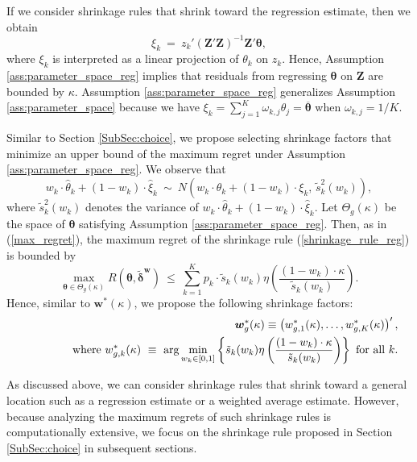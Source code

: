 \documentclass[12pt,a4paper]{article}
\begin{document}
If we consider shrinkage rules that shrink toward the regression estimate, then we obtain
\[
\xi_k \ = \ z_k' \left( \bm{Z}'\bm{Z} \right)^{-1} \bm{Z}' \bm{\theta},
\]
where $\xi_k$ is interpreted as a linear projection of $\theta_k$ on $z_k$. Hence, Assumption \ref{ass:parameter_space_reg} implies that residuals from regressing $\bm{\theta}$ on $\bm{Z}$ are bounded by $\kappa$. Assumption \ref{ass:parameter_space_reg} generalizes Assumption \ref{ass:parameter_space} because we have $\xi_k = \sum_{j=1}^K \omega_{k,j} \theta_j = \overline{\bm{\theta}}$ when $\omega_{k,j} = 1/K$.

Similar to Section \ref{SubSec:choice}, we propose selecting shrinkage factors that minimize an upper bound of the maximum regret under Assumption \ref{ass:parameter_space_reg}. We observe that
\[
 w_k \cdot \hat{\theta}_k + (1-w_k) \cdot \hat{\xi}_k \ \sim \ N \left( w_k \cdot \theta_k + (1-w_k) \cdot \xi_k, \,\tilde{s}_k^2(w_k) \right),
\]
where $\tilde{s}_k^2(w_k)$ denotes the variance of $w_k \cdot \hat{\theta}_k + (1-w_k) \cdot \hat{\xi}_k$. Let $\Theta_{g}(\kappa)$ be the space of $\bm{\theta}$ satisfying Assumption \ref{ass:parameter_space_reg}. Then, as in (\ref{max_regret}), the maximum regret of the shrinkage rule (\ref{shrinkage_rule_reg}) is bounded by
$$
\max_{\bm{\theta} \in \Theta_{g}(\kappa)} R(\bm{\theta}, \tilde{\bm{\delta}}^{\bm{w}}) \ \leq \ \sum_{k=1}^K p_k \cdot \tilde{s}_k(w_k) \eta \left( \frac{(1-w_k) \cdot \kappa}{\tilde{s}_k(w_k)} \right).
$$
Hence, similar to $\bm{w}^{\ast}(\kappa)$, we propose the following shrinkage factors:
\begin{eqnarray*}
& & \bm{w}^{\ast}_{g}(\kappa) \equiv \left( w_{g,1}^{\ast}(\kappa), \ldots, w_{g,K}^{\ast}(\kappa) \right)', \\
& & \hspace{0.5in} \text{where} \ w_{g,k}^{\ast}(\kappa) \ \equiv \ \text{arg} \min_{w_k \in [0,1]} \left\{ \tilde{s}_k(w_k) \eta \left( \frac{(1-w_k) \cdot \kappa}{\tilde{s}_k(w_k)} \right) \right\} \ \text{for all $k$}.
\end{eqnarray*}

As discussed above, we can consider shrinkage rules that shrink toward a general location such as a regression estimate or a weighted average estimate. However, because analyzing the maximum regrets of such shrinkage rules is computationally extensive, we focus on the shrinkage rule proposed in Section \ref{SubSec:choice} in subsequent sections.


\end{document}
